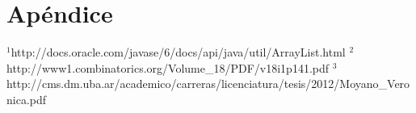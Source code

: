\section{Apéndice}

$^{1}$http://docs.oracle.com/javase/6/docs/api/java/util/ArrayList.html
$^{2}$http://www1.combinatorics.org/Volume_18/PDF/v18i1p141.pdf
$^{3}$http://cms.dm.uba.ar/academico/carreras/licenciatura/tesis/2012/Moyano_Veronica.pdf
